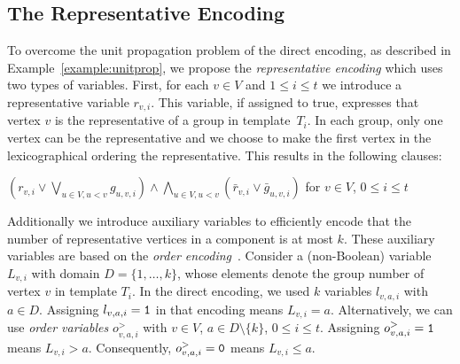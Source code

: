 \documentclass[10pt,usletter]{article}
\newenvironment{myquote}{\begin{center}
    \begin{minipage}{.80\linewidth}}{\end{minipage}\end{center}}
\theoremstyle{remark}
\begin{document}
\subsection{The Representative Encoding}

To overcome the unit propagation problem of the direct encoding, as
described in Example~\ref{example:unitprop}, we propose the {\em
  representative encoding} which uses two types of variables. First,
for each $v\in V$ and $1\leq i \leq t$ we introduce a representative
variable $r_{v,i}$. This variable, if assigned to true, expresses that
vertex $v$ is the representative of a group in
template~$T_i$.  In each group, only one vertex can be the
representative and we choose to make the first vertex in the
lexicographical ordering the representative. 
This results in the following clauses:
\begin{myquote}
$( r_{v,i} \lor  \bigvee_{u\in V, u < v}  g_{u,v,i} ) \land \bigwedge_{u \in V, u < v} (\bar r_{v,i} \lor \bar g_{u,v,i} )$
\qquad for $v \in V$, $0\leq i \leq t$


\end{myquote}
\medskip\noindent Additionally we introduce auxiliary variables
to efficiently encode that the number of representative vertices in a
component is at most $k$.
These auxiliary variables are based on the {\em
  order encoding}~\cite{TamuraTagaKitagawaBanbara09}.  Consider a
(non-Boolean) variable $L_{v,i}$ with domain $D = \{1,\dots,k\}$,
whose elements denote the group number of vertex $v$ in template
$T_i$. In the direct encoding, we used $k$ variables $l_{v,a,i}$ with
$a \in D$. Assigning $l_{v,a,i} = {\tt 1}$ in that encoding means
$L_{v,i} = a$.  Alternatively, we can use {\em order variables}
$o^>_{v,a,i}$ with $v \in V$, $a \in D \setminus \{k\}$, $ 0 \leq i
\leq t$.  Assigning $o^>_{v,a,i} = {\tt 1}$ means $L_{v,i} >
a$. Consequently, $o^>_{v,a,i} = {\tt 0}$ means $L_{v,i} \leq a$.
\end{document}
